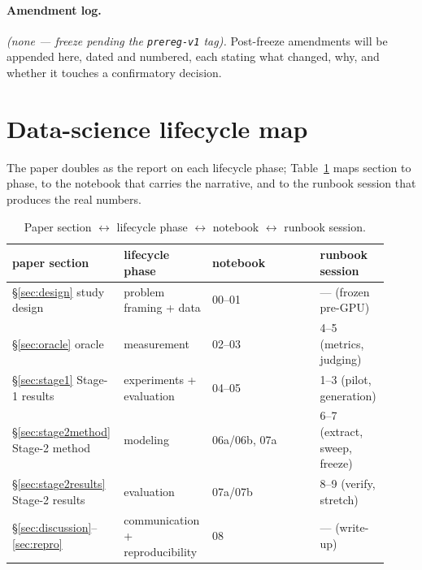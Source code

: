 \paragraph{Amendment log.} \emph{(none --- freeze pending the \texttt{prereg-v1} tag).} Post-freeze
amendments will be appended here, dated and numbered, each stating what changed, why, and whether it
touches a confirmatory decision.

\section{Data-science lifecycle map}
\label{app:lifecycle}

The paper doubles as the report on each lifecycle phase; Table~\ref{tab:lifecycle} maps section to phase,
to the notebook that carries the narrative, and to the runbook session that produces the real numbers.

\begin{table}[htbp]
\centering\footnotesize
\caption{Paper section $\leftrightarrow$ lifecycle phase $\leftrightarrow$ notebook $\leftrightarrow$
runbook session.}
\label{tab:lifecycle}
\begin{tabular}{@{}p{0.26\linewidth}p{0.20\linewidth}p{0.28\linewidth}p{0.18\linewidth}@{}}
\toprule
paper section & lifecycle phase & notebook & runbook session \\
\midrule
\S\ref{sec:design} study design & problem framing + data & 00--01 & --- (frozen pre-GPU) \\
\S\ref{sec:oracle} oracle & measurement & 02--03 & 4--5 (metrics, judging) \\
\S\ref{sec:stage1} Stage-1 results & experiments + evaluation & 04--05 & 1--3 (pilot, generation) \\
\S\ref{sec:stage2method} Stage-2 method & modeling & 06a/06b, 07a & 6--7 (extract, sweep, freeze) \\
\S\ref{sec:stage2results} Stage-2 results & evaluation & 07a/07b & 8--9 (verify, stretch) \\
\S\ref{sec:discussion}--\ref{sec:repro} & communication + reproducibility & 08 & --- (write-up) \\
\bottomrule
\end{tabular}
\end{table}
